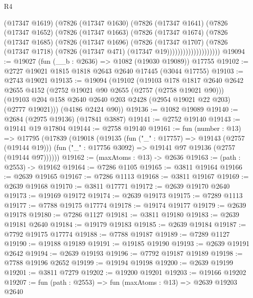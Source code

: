 \begin{lexlean}{R4}
\begin{coremodule}
                      (@17347 @1619)
                      (@7826
                        (@17347 @1630)
                        (@7826
                          (@17347 @1641)
                          (@7826
                            (@17347 @1652)
                            (@7826
                              (@17347 @1663)
                              (@7826
                                (@17347 @1674)
                                (@7826
                                  (@17347 @1685)
                                  (@7826
                                    (@17347 @1696)
                                    (@7826
                                      (@17347 @1707)
                                      (@7826
                                        (@17347 @1718)
                                        (@7826 (@17347 @471) (@17347 @19))))))))))))))))))))
@19094 := @19027 (fun (__b : @2636) => @1082 (@19030 @19089)) @17755
@19102 := @2727 @19021 @1815 @1818 @2643 @2640 @17445 (@3044 @17755)
@19103 := @2743 @19021
@19135 := @19094
    (@19102
      (@19103
        @178
        @1817
        @2640
        @2642
        @2655
        @4152
        (@2752 @19021 @90 @2655 (@2757 (@2758 @19021 @90)))
        (@19103 @204 @158 @2640 @2640 @203 @2428 (@2954 @19021 @22 @203) (@2777 @19021)))
      (@4186 @2424 @90))
@19136 := @1082 @19089
@19140 := @2684 (@2975 @19136) (@17841 @3887)
@19141 := @2752 @19140
@19143 := @19141 @19 @17804
@19144 := @2758 @19140
@19161 := fun (number : @13) =>
  @17795
    (@17839
      (@19018
        (@19135
          (fun ("_" : @17757) => @19143 (@2757 (@19144 @19)))
          (fun ("_" : @17756 @3092) => @19141 @97 @19136 (@2757 (@19144 @97))))))
@19162 := (maxAtoms : @13) -> @2636
@19163 := (path : @2553) -> @19162
@19164 := @7286 @1105
@19165 := @3811 @19164
@19166 := @2639 @19165
@19167 := @7286 @1113
@19168 := @3811 @19167
@19169 := @2639 @19168
@19170 := @3811 @17771
@19172 := @2639 @19170 @2640
@19173 := @19169 @19172
@19174 := @2639 @19173
@19175 := @7289 @1113
@19177 := @7788 @19175 @17774
@19178 := @19174 @19177
@19179 := @2639 @19178
@19180 := @7286 @1127
@19181 := @3811 @19180
@19183 := @2639 @19181 @2640
@19184 := @19179 @19183
@19185 := @2639 @19184
@19187 := @7792 @19175 @17774
@19188 := @7788 @19187
@19189 := @7289 @1127
@19190 := @19188 @19189
@19191 := @19185 @19190
@19193 := @2639 @19191 @2642
@19194 := @2639 @19193
@19196 := @7792 @19187 @19189
@19198 := @7788 @19196 @2652
@19199 := @19194 @19198
@19200 := @2639 @19199
@19201 := @3811 @7279
@19202 := @19200 @19201
@19203 := @19166 @19202
@19207 := fun (path : @2553) => fun (maxAtoms : @13) => @2639 @19203 @2640

\end{coremodule}
\end{lexlean}
